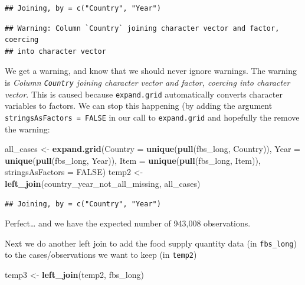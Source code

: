 \documentclass[]{book}
\newenvironment{Shaded}{\begin{snugshade}}{\end{snugshade}}
\newcommand{\DataTypeTok}[1]{\textcolor[rgb]{0.13,0.29,0.53}{#1}}
\newcommand{\KeywordTok}[1]{\textcolor[rgb]{0.13,0.29,0.53}{\textbf{#1}}}
\newcommand{\NormalTok}[1]{#1}
\newcommand{\OtherTok}[1]{\textcolor[rgb]{0.56,0.35,0.01}{#1}}
\newcommand{\StringTok}[1]{\textcolor[rgb]{0.31,0.60,0.02}{#1}}
\begin{document}
\begin{verbatim}
## Joining, by = c("Country", "Year")
\end{verbatim}

\begin{verbatim}
## Warning: Column `Country` joining character vector and factor, coercing
## into character vector
\end{verbatim}

We get a warning, and know that we should never ignore warnings. The warning is \emph{Column \texttt{Country} joining character vector and factor, coercing into character vector}. This is caused because \texttt{expand.grid} automatically converts character variables to factors. We can stop this happening (by adding the argument \texttt{stringsAsFactors\ =\ FALSE} in our call to \texttt{expand.grid} and hopefully the remove the warning:

\begin{Shaded}
\begin{Highlighting}[]
\NormalTok{all_cases <-}\StringTok{ }\KeywordTok{expand.grid}\NormalTok{(}\DataTypeTok{Country =} \KeywordTok{unique}\NormalTok{(}\KeywordTok{pull}\NormalTok{(fbs_long, Country)),}
                         \DataTypeTok{Year =} \KeywordTok{unique}\NormalTok{(}\KeywordTok{pull}\NormalTok{(fbs_long, Year)),}
                         \DataTypeTok{Item =} \KeywordTok{unique}\NormalTok{(}\KeywordTok{pull}\NormalTok{(fbs_long, Item)),}
                         \DataTypeTok{stringsAsFactors =} \OtherTok{FALSE}\NormalTok{)}
\NormalTok{temp2 <-}\StringTok{ }\KeywordTok{left_join}\NormalTok{(country_year_not_all_missing, all_cases)}
\end{Highlighting}
\end{Shaded}

\begin{verbatim}
## Joining, by = c("Country", "Year")
\end{verbatim}

Perfect\ldots{} and we have the expected number of 943,008 observations.

Next we do another left join to add the food supply quantity data (in \texttt{fbs\_long}) to the cases/observations we want to keep (in \texttt{temp2})

\begin{Shaded}
\begin{Highlighting}[]
\NormalTok{temp3 <-}\StringTok{ }\KeywordTok{left_join}\NormalTok{(temp2, fbs_long)}
\end{Highlighting}
\end{Shaded}
\end{document}
